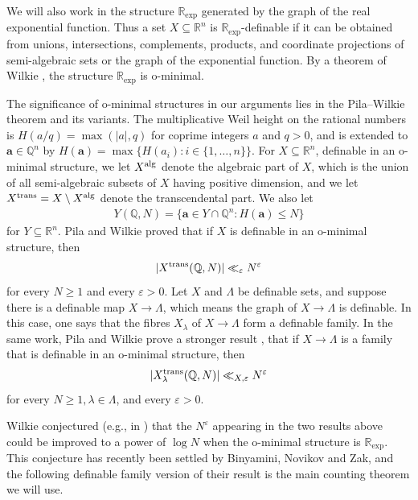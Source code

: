 \documentclass[9pt]{amsart}
\theoremstyle{my_theorem_style}
\numberwithin{definition}{section}
\newcommand{\eps}{\varepsilon}
\newcommand{\Q}{\mathbb{Q}}
\newcommand{\R}{\mathbb{R}}
\renewcommand{\vec}[1]{\bm{#1}}
\begin{document}
We will also work in the structure $\R_{\exp}$ generated by the graph of the real exponential function. Thus a set $X \subseteq \R^n$ is $\R_{\exp}$-definable if it can be obtained from unions, intersections, complements, products, and coordinate projections of semi-algebraic sets or the graph of the exponential function. By a theorem of Wilkie \cite{Wilkie_model_completeness_results_for_expansions_of_the_ordered_field_of_real_numbers_by_restricted_Pfaffian_functions_and_the_exponential_functions}, the structure $\R_{\exp}$ is o-minimal.

The significance of o-minimal structures in our arguments lies in the Pila--Wilkie theorem and its variants. The multiplicative Weil height on the rational numbers is $H(a/q) = \max(|a|, q)$ for coprime integers $a$ and $q > 0$, and is extended to $\vec{a} \in \Q^n$ by $H(\vec{a}) = \max\{H(a_i) : i \in \{1, \dots, n\}\}$. For $X \subseteq \R^n$, definable in an o-minimal structure, we let $X^{\rm alg}$ denote the algebraic part of $X$, which is the union of all semi-algebraic subsets of $X$ having positive dimension, and we let $X^{\rm trans} = X \setminus X^{\rm alg}$ denote the transcendental part. We also let
\begin{align*}
    Y(\Q, N) = \{\vec{a} \in Y \cap \Q^n : H(\vec{a}) \leq N\}
\end{align*}
for $Y \subseteq \R^n$. Pila and Wilkie proved \cite[Theorem 1.8]{Pila--Wilkie_the_rational_points_on_a_definable_set} that if $X$ is definable in an o-minimal structure, then
\begin{align*}
    |X^{\rm trans}(\Q, N)| \ll_\eps N^\eps
\end{align*}
for every $N \geq 1$ and every $\eps > 0$. Let $X$ and $\Lambda$ be definable sets, and suppose there is a definable map $X \to \Lambda$, which means the graph of $X \to \Lambda$ is definable. In this case, one says that the fibres $X_\lambda$ of $X \to \Lambda$ form a definable family. In the same work, Pila and Wilkie prove a stronger result \cite[Theorem 1.9]{Pila--Wilkie_the_rational_points_on_a_definable_set}, that if $X \to \Lambda$ is a family that is definable in an o-minimal structure, then
\begin{align*}
    |X^{\rm trans}_\lambda(\Q, N)| \ll_{X, \eps} N^\eps
\end{align*}
for every $N \geq 1, \lambda \in \Lambda$, and every $\eps > 0$.

Wilkie conjectured (e.g., in \cite[Conjecture 1.11]{Pila--Wilkie_the_rational_points_on_a_definable_set}) that the $N^\eps$ appearing in the two results above could be improved to a power of $\log N$ when the o-minimal structure is $\R_{\exp}$. This conjecture has recently been settled by Binyamini, Novikov and Zak, and the following definable family version of their result is the main counting theorem we will use.
\end{document}
